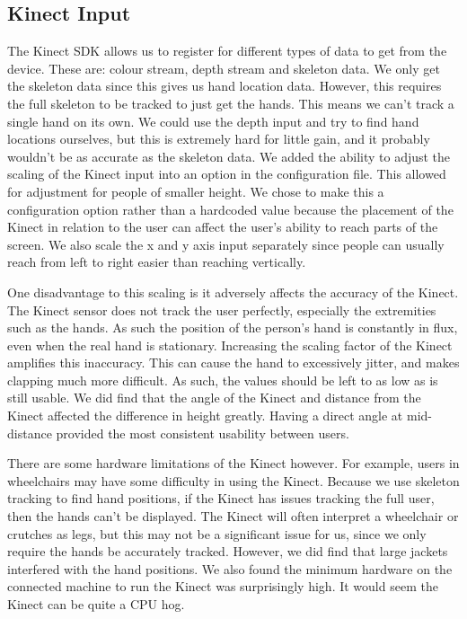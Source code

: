 \subsection{Kinect Input}
The Kinect SDK allows us to register for different types of data to get from the device. These are: colour stream, depth stream and skeleton data. We only get the skeleton data since this gives us hand location data. However, this requires the full skeleton to be tracked to just get the hands. This means we can't track a single hand on its own. We could use the depth input and try to find hand locations ourselves, but this is extremely hard for little gain, and it probably wouldn't be as accurate as the skeleton data.
We added the ability to adjust the scaling of the Kinect input into an option in the configuration file. This allowed for adjustment for people of smaller height. We chose to make this a configuration option rather than a hardcoded value because the placement of the Kinect in relation to the user can affect the user's ability to reach parts of the screen. We also scale the x and y axis input separately since people can usually reach from left to right easier than reaching vertically.

One disadvantage to this scaling is it adversely affects the accuracy of the Kinect. The Kinect sensor does not track the user perfectly, especially the extremities such as the hands. As such the position of the person's hand is constantly in flux, even when the real hand is stationary. Increasing the scaling factor of the Kinect amplifies this inaccuracy. This can cause the hand to excessively jitter, and makes clapping much more difficult. As such, the values should be left to as low as is still usable.
We did find that the angle of the Kinect and distance from the Kinect affected the difference in height greatly. Having a direct angle at mid-distance provided the most consistent usability between users.

There are some hardware limitations of the Kinect however. For example, users in wheelchairs may have some difficulty in using the Kinect. Because we use skeleton tracking to find hand positions, if the Kinect has issues tracking the full user, then the hands can't be displayed. The Kinect will often interpret a wheelchair or crutches as legs, but this may not be a significant issue for us, since we only require the hands be accurately tracked. However, we did find that large jackets interfered with the hand positions.
We also found the minimum hardware on the connected machine to run the Kinect was surprisingly high. It would seem the Kinect can be quite a CPU hog.

